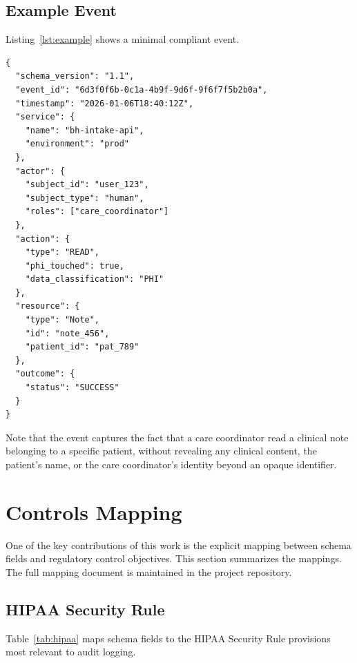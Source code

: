 \documentclass[11pt,a4paper]{article}
\begin{document}
\subsection{Example Event}

Listing~\ref{lst:example} shows a minimal compliant event.

\begin{lstlisting}[style=json, caption={A minimal BH Audit Schema v1.1 event recording a care coordinator reading a patient note.}, label=lst:example]
{
  "schema_version": "1.1",
  "event_id": "6d3f0f6b-0c1a-4b9f-9d6f-9f6f7f5b2b0a",
  "timestamp": "2026-01-06T18:40:12Z",
  "service": {
    "name": "bh-intake-api",
    "environment": "prod"
  },
  "actor": {
    "subject_id": "user_123",
    "subject_type": "human",
    "roles": ["care_coordinator"]
  },
  "action": {
    "type": "READ",
    "phi_touched": true,
    "data_classification": "PHI"
  },
  "resource": {
    "type": "Note",
    "id": "note_456",
    "patient_id": "pat_789"
  },
  "outcome": {
    "status": "SUCCESS"
  }
}
\end{lstlisting}

Note that the event captures the fact that a care coordinator read a clinical note belonging to a specific patient, without revealing any clinical content, the patient's name, or the care coordinator's identity beyond an opaque identifier.

\section{Controls Mapping}

One of the key contributions of this work is the explicit mapping between schema fields and regulatory control objectives. This section summarizes the mappings. The full mapping document is maintained in the project repository.

\subsection{HIPAA Security Rule}

Table~\ref{tab:hipaa} maps schema fields to the HIPAA Security Rule provisions most relevant to audit logging.
\end{document}
